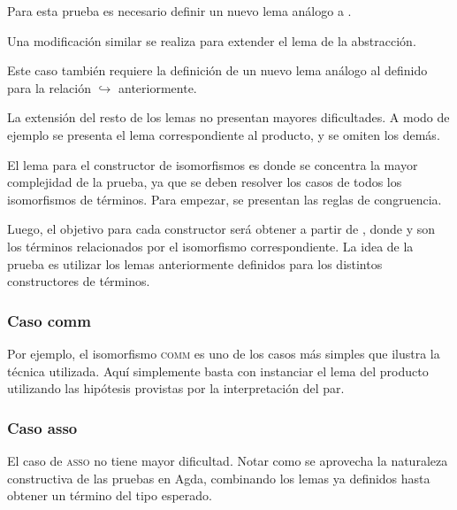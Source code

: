 Para esta prueba es necesario definir un nuevo lema análogo a .


Una modificación similar se realiza para extender el lema de la abstracción.


Este caso también requiere la definición de un nuevo lema análogo al definido para la relación $\hookrightarrow$ anteriormente.


La extensión del resto de los lemas no presentan mayores dificultades.
A modo de ejemplo se presenta el lema correspondiente al producto, y se omiten los demás.


El lema para el constructor de isomorfismos es donde se concentra la mayor complejidad de la prueba, ya que se deben resolver los casos de todos los isomorfismos de términos.
Para empezar, se presentan las reglas de congruencia.


Luego, el objetivo para cada constructor será obtener \snstar{} a partir de \snstar{}, donde  y  son los términos relacionados por el isomorfismo correspondiente.
La idea de la prueba es utilizar los lemas anteriormente definidos para los distintos constructores de términos.

\subsubsection{Caso comm}

Por ejemplo, el isomorfismo \textsc{comm} es uno de los casos más simples que ilustra la técnica utilizada.
Aquí simplemente basta con instanciar el lema del producto utilizando las hipótesis provistas por la interpretación del par.


\subsubsection{Caso asso}

El caso de \textsc{asso} no tiene mayor dificultad.
Notar como se aprovecha la naturaleza constructiva de las pruebas en Agda, combinando los lemas ya definidos hasta obtener un término del tipo esperado.

